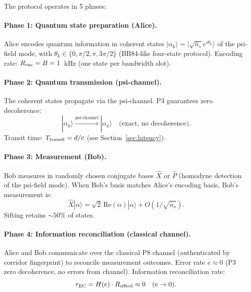 \documentclass[aps,prd,twocolumn,superscriptaddress,nofootinbib]{revtex4-2}
\begin{document}
The protocol operates in 5 phases:

\paragraph{Phase 1: Quantum state preparation (Alice).}
Alice encodes quantum information in coherent states
$|\alpha_k\rangle = |\sqrt{\bar{n}_s} e^{i\theta_k}\rangle$ of the psi-field mode,
with $\theta_k \in \{0, \pi/2, \pi, 3\pi/2\}$ (BB84-like four-state protocol).
Encoding rate: $R_{\rm enc} = B = 1$~kHz (one state per bandwidth slot).

\paragraph{Phase 2: Quantum transmission (psi-channel).}
The coherent states propagate via the psi-channel. P3 guarantees
zero decoherence:
\begin{equation}
|\alpha_k\rangle \xrightarrow{\text{psi-channel}} |\alpha_k\rangle
\quad \text{(exact, no decoherence)}.
\end{equation}
Transit time: $T_{\rm transit} = d/c$ (see Section~\ref{sec:latency}).

\paragraph{Phase 3: Measurement (Bob).}
Bob measures in randomly chosen conjugate bases
$\hat{X}$ or $\hat{P}$ (homodyne detection of the psi-field mode).
When Bob's basis matches Alice's encoding basis, Bob's measurement is:
\begin{equation}
\hat{X}|\alpha\rangle = \sqrt{2}\,\mathrm{Re}(\alpha)|\alpha\rangle + O(1/\sqrt{\bar{n}_s}).
\end{equation}
Sifting retains $\sim 50\%$ of states.

\paragraph{Phase 4: Information reconciliation (classical channel).}
Alice and Bob communicate over the classical P8 channel (authenticated
by corridor fingerprint) to reconcile measurement outcomes.
Error rate $e \approx 0$ (P3 zero decoherence, no errors from channel).
Information reconciliation rate:
\begin{equation}
r_{\rm EC} = H(e) \cdot R_{\rm sifted} \approx 0 \quad (e \to 0).
\label{eq:rEC}
\end{equation}
\end{document}
